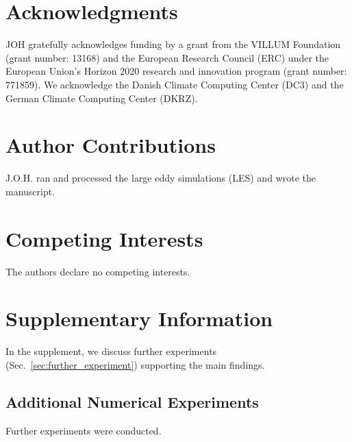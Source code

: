 \documentclass[draft,linenumbers]{agujournal2019}
\begin{document}
\section*{Acknowledgments}
\noindent
JOH gratefully acknowledges funding by a grant from the VILLUM Foundation (grant number: 13168) and the European Research Council (ERC) under the European Union's Horizon 2020 research and innovation program (grant number: 771859). 
We acknowledge the Danish Climate Computing Center (DC3) and the German Climate Computing Center (DKRZ).

\section*{Author Contributions}
\noindent
J.O.H. ran and processed the large eddy simulations (LES) and wrote the manuscript.
\\
\section*{Competing Interests}
\noindent
The authors declare no competing interests.

\pagebreak
\clearpage

\renewcommand{\theequation}{S\arabic{equation}}
\renewcommand{\thesection}{S\arabic{section}}
\renewcommand{\thefigure}{S\arabic{figure}}

\setcounter{equation}{0}
\setcounter{figure}{0}
\setcounter{section}{0}

\section*{Supplementary Information}\label{sec:supp}
\noindent
In the supplement, we discuss further experiments (Sec.~\ref{sec:further_experiment}) supporting the main findings.

\subsection*{Additional Numerical Experiments}\label{sec:further_experiments}
Further experiments were conducted.
\end{document}
